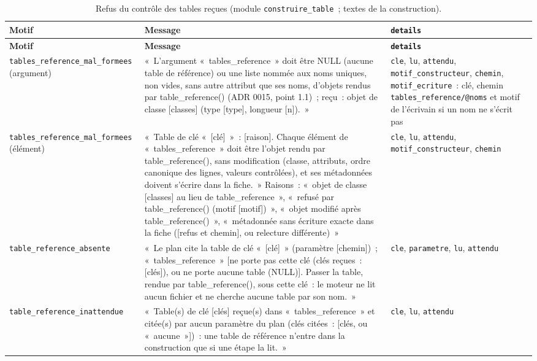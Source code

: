 \documentclass[a4paper,11pt]{article}
\newcommand{\code}[1]{\texttt{\small #1}}
\begin{document}
{\footnotesize
{}
\begin{longtable}{@{}p{5.2cm}p{6.0cm}p{3.4cm}@{}}
\caption{Refus du contrôle des tables reçues (module \code{construire\_table}~; textes de la construction).}
\label{tab:refus-tables-reference}\\
\rowcolor{tableheader}
\textcolor{financeblue}{\textbf{Motif}} &
\textcolor{financeblue}{\textbf{Message}} &
\textcolor{financeblue}{\textbf{\code{details}}} \\
\endfirsthead
\rowcolor{tableheader}
\textcolor{financeblue}{\textbf{Motif}} &
\textcolor{financeblue}{\textbf{Message}} &
\textcolor{financeblue}{\textbf{\code{details}}} \\
\endhead
\code{tables\_reference\_mal\_formees} (argument) & «~L'argument «~tables\_reference~» doit être NULL (aucune table de référence) ou une liste nommée aux noms uniques, non vides, sans autre attribut que ses noms, d'objets rendus par table\_reference() (ADR 0015, point 1.1)~; reçu~: objet de classe [classes] (type [type], longueur [n]).~» & \code{cle}, \code{lu}, \code{attendu}, \code{motif\_constructeur}, \code{chemin}, \code{motif\_ecriture}~: clé, chemin \code{tables\_reference/}\allowbreak\code{@noms} et motif de l'écrivain si un nom ne s'écrit pas \\
\code{tables\_reference\_mal\_formees} (élément) & «~Table de clé «~[clé]~»~: [raison]. Chaque élément de «~tables\_reference~» doit être l'objet rendu par table\_reference(), sans modification (classe, attributs, ordre canonique des lignes, valeurs contrôlées), et ses métadonnées doivent s'écrire dans la fiche.~» Raisons~: «~objet de classe [classes] au lieu de table\_reference~», «~refusé par table\_reference() (motif [motif])~», «~objet modifié après table\_reference()~», «~métadonnée sans écriture exacte dans la fiche ([refus et chemin], ou relecture différente)~» & \code{cle}, \code{lu}, \code{attendu}, \code{motif\_constructeur}, \code{chemin} \\
\code{table\_reference\_absente} & «~Le plan cite la table de clé «~[clé]~» (paramètre [chemin])~; «~tables\_reference~» [ne porte pas cette clé (clés reçues~: [clés]), ou ne porte aucune table (NULL)]. Passer la table, rendue par table\_reference(), sous cette clé~: le moteur ne lit aucun fichier et ne cherche aucune table par son nom.~» & \code{cle}, \code{parametre}, \code{lu}, \code{attendu} \\
\code{table\_reference\_inattendue} & «~Table(s) de clé [clés] reçue(s) dans «~tables\_reference~» et citée(s) par aucun paramètre du plan (clés citées~: [clés, ou «~aucune~»])~: une table de référence n'entre dans la construction que si une étape la lit.~» & \code{cle}, \code{lu}, \code{attendu} \\

\end{longtable}}
\end{document}
